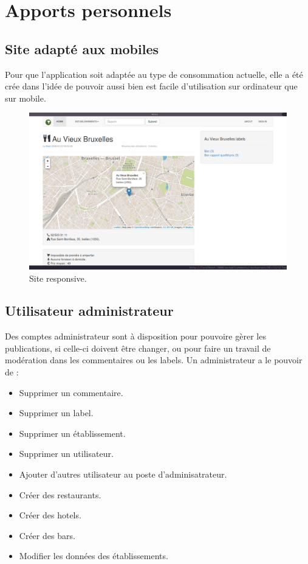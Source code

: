 \documentclass[a4paper,10pt]{article}
\begin{document}
\section{Apports personnels}
\subsection{Site adapté aux mobiles}
    Pour que l'application soit adaptée au type de consommation actuelle, elle
    a été crée dans l'idée de pouvoir aussi bien est facile d'utilisation sur
    ordinateur que sur mobile.

    \begin{figure}[h]
        \centering
        \includegraphics[scale=0.2]{./images/responsive.png}
        \caption{Site responsive.}
    \end{figure}

\subsection{Utilisateur administrateur}
    Des comptes administrateur sont à disposition pour pouvoire gèrer les
    publications, si celle-ci doivent être changer, ou pour faire un travail de
    modération dans les commentaires ou les labels.
    Un administrateur a le pouvoir de :
    \begin{itemize}
        \item Supprimer un commentaire.
        \item Supprimer un label.
        \item Supprimer un établissement.
        \item Supprimer un utilisateur.
        \item Ajouter d'autres utilisateur au poste d'adminisatrateur.
        \item Créer des restaurants.
        \item Créer des hotels.
        \item Créer des bars.
        \item Modifier les données des établissements.
    \end{itemize}
\end{document}
